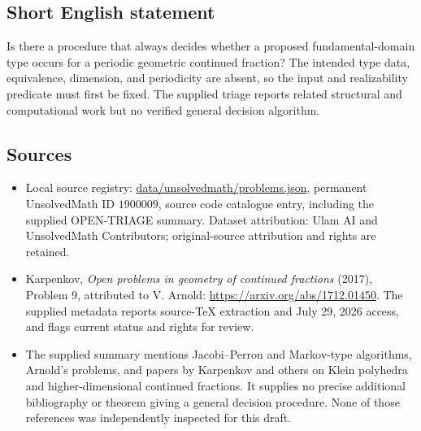 \documentclass[11pt]{article}
\begin{document}
\subsection{Short English statement}
Is there a procedure that always decides whether a proposed fundamental-domain type occurs for a periodic geometric continued fraction? The intended type data, equivalence, dimension, and periodicity are absent, so the input and realizability predicate must first be fixed. The supplied triage reports related structural and computational work but no verified general decision algorithm.
\subsection{Sources}
\begin{itemize}
\item Local source registry: \url{data/unsolvedmath/problems.json}, permanent UnsolvedMath ID $1900009$, source code catalogue entry, including the supplied OPEN-TRIAGE summary. Dataset attribution: Ulam AI and UnsolvedMath Contributors; original-source attribution and rights are retained.
\item Karpenkov, \emph{Open problems in geometry of continued fractions} (2017), Problem 9, attributed to V. Arnold: \url{https://arxiv.org/abs/1712.01450}. The supplied metadata reports source-TeX extraction and July 29, 2026 access, and flags current status and rights for review.
\item The supplied summary mentions Jacobi--Perron and Markov-type algorithms, Arnold's problems, and papers by Karpenkov and others on Klein polyhedra and higher-dimensional continued fractions. It supplies no precise additional bibliography or theorem giving a general decision procedure. None of those references was independently inspected for this draft.
\end{itemize}
\end{document}
